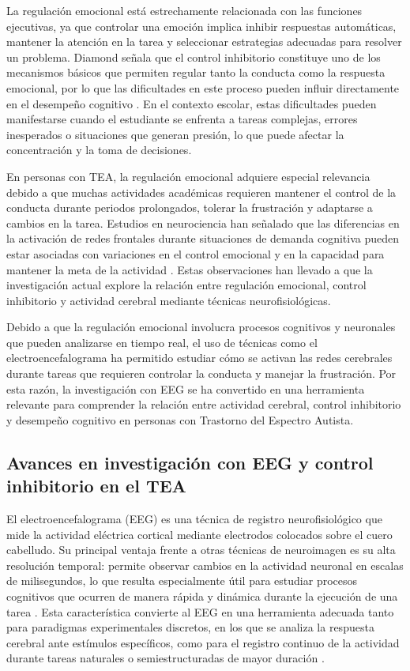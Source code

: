 \documentclass{book}
\begin{document}
La regulación emocional está estrechamente relacionada con las funciones ejecutivas, ya que controlar una emoción implica inhibir respuestas automáticas, mantener la atención en la tarea y seleccionar estrategias adecuadas para resolver un problema. Diamond señala que el control inhibitorio constituye uno de los mecanismos básicos que permiten regular tanto la conducta como la respuesta emocional, por lo que las dificultades en este proceso pueden influir directamente en el desempeño cognitivo \cite{Diamond2013}. En el contexto escolar, estas dificultades pueden manifestarse cuando el estudiante se enfrenta a tareas complejas, errores inesperados o situaciones que generan presión, lo que puede afectar la concentración y la toma de decisiones.

En personas con TEA, la regulación emocional adquiere especial relevancia debido a que muchas actividades académicas requieren mantener el control de la conducta durante periodos prolongados, tolerar la frustración y adaptarse a cambios en la tarea. Estudios en neurociencia han señalado que las diferencias en la activación de redes frontales durante situaciones de demanda cognitiva pueden estar asociadas con variaciones en el control emocional y en la capacidad para mantener la meta de la actividad \cite{Lord2018, Samson2014}. Estas observaciones han llevado a que la investigación actual explore la relación entre regulación emocional, control inhibitorio y actividad cerebral mediante técnicas neurofisiológicas.

Debido a que la regulación emocional involucra procesos cognitivos y neuronales que pueden analizarse en tiempo real, el uso de técnicas como el electroencefalograma ha permitido estudiar cómo se activan las redes cerebrales durante tareas que requieren controlar la conducta y manejar la frustración. Por esta razón, la investigación con EEG se ha convertido en una herramienta relevante para comprender la relación entre actividad cerebral, control inhibitorio y desempeño cognitivo en personas con Trastorno del Espectro Autista.


\subsection{Avances en investigación con EEG y control 
inhibitorio en el TEA}

El electroencefalograma (EEG) es una técnica de registro 
neurofisiológico que mide la actividad eléctrica cortical 
mediante electrodos colocados sobre el cuero cabelludo. 
Su principal ventaja frente a otras técnicas de neuroimagen 
es su alta resolución temporal: permite observar cambios 
en la actividad neuronal en escalas de milisegundos, lo 
que resulta especialmente útil para estudiar procesos 
cognitivos que ocurren de manera rápida y dinámica durante 
la ejecución de una tarea \cite{Luck2014}. Esta 
característica convierte al EEG en una herramienta 
adecuada tanto para paradigmas experimentales discretos, 
en los que se analiza la respuesta cerebral ante estímulos 
específicos, como para el registro continuo de la actividad 
durante tareas naturales o semiestructuradas de mayor 
duración \cite{Uhlhaas2006}.
\end{document}
